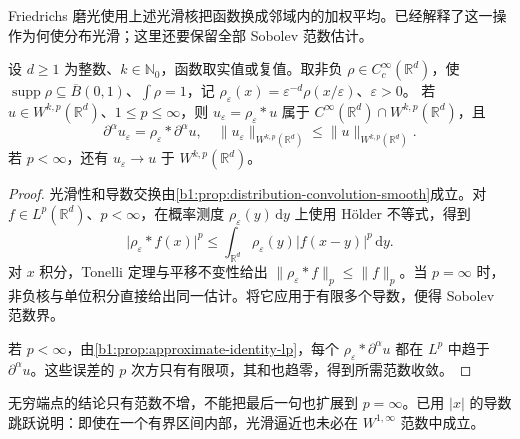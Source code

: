 Friedrichs 磨光使用上述光滑核把函数换成邻域内的加权平均。已经解释了这一操作为何使分布光滑；这里还要保留全部 Sobolev 范数估计。

\begin{proposition}\label{b1:prop:sobolev-friedrichs-smoothing}
设 \(d\geq1\) 为整数、\(k\in\mathbb N_0\)，函数取实值或复值。取非负 \(\rho\in C_c^\infty(\mathbb R^d)\)，使 \(\operatorname{supp}\rho\subseteq\overline B(0,1)\)、\(\int\rho=1\)，记 \(\rho_\varepsilon(x)=\varepsilon^{-d}\rho(x/\varepsilon)\)、\(\varepsilon>0\)。
若 \(u\in W^{k,p}(\mathbb R^d)\)、\(1\leq p\leq\infty\)，则
\(u_\varepsilon=\rho_\varepsilon*u\) 属于 \(C^\infty(\mathbb R^d)\cap W^{k,p}(\mathbb R^d)\)，且
\[
 \partial^\alpha u_\varepsilon
 =\rho_\varepsilon*\partial^\alpha u,
 \quad
 \|u_\varepsilon\|_{W^{k,p}(\mathbb R^d)}
 \leq\|u\|_{W^{k,p}(\mathbb R^d)}.
\]
若 \(p<\infty\)，还有 \(u_\varepsilon\to u\) 于 \(W^{k,p}(\mathbb R^d)\)。
\end{proposition}
\begin{proof}
光滑性和导数交换由\cref{b1:prop:distribution-convolution-smooth}成立。对 \(f\in L^p(\mathbb R^d)\)、\(p<\infty\)，在概率测度 \(\rho_\varepsilon(y)\,\mathrm dy\) 上使用 Hölder 不等式，得到
\[
 \bigl|\rho_\varepsilon*f(x)\bigr|^p
 \leq\int_{\mathbb R^d}\rho_\varepsilon(y)|f(x-y)|^p\,\mathrm dy.
\]
对 \(x\) 积分，Tonelli 定理与平移不变性给出 \(\|\rho_\varepsilon*f\|_p\leq\|f\|_p\)。当 \(p=\infty\) 时，非负核与单位积分直接给出同一估计。将它应用于有限多个导数，便得 Sobolev 范数界。

若 \(p<\infty\)，由\cref{b1:prop:approximate-identity-lp}，每个 \(\rho_\varepsilon*\partial^\alpha u\) 都在 \(L^p\) 中趋于 \(\partial^\alpha u\)。这些误差的 \(p\) 次方只有有限项，其和也趋零，得到所需范数收敛。
\end{proof}

无穷端点的结论只有范数不增，不能把最后一句也扩展到 \(p=\infty\)。已用 \(|x|\) 的导数跳跃说明：即使在一个有界区间内部，光滑逼近也未必在 \(W^{1,\infty}\) 范数中成立。


